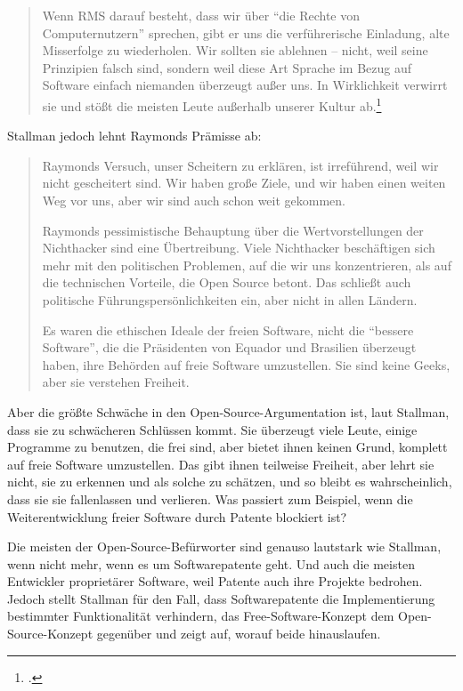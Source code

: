 \begin{quote}
Wenn RMS darauf besteht, dass wir über "`die Rechte von Computernutzern"' sprechen, gibt er uns die verführerische Einladung, alte Misserfolge zu wiederholen. Wir sollten sie ablehnen – nicht, weil seine Prinzipien falsch sind, sondern weil diese Art Sprache im Bezug auf Software einfach niemanden überzeugt außer uns. In Wirklichkeit verwirrt sie und stößt die meisten Leute außerhalb unserer Kultur ab.\footcite[][]{esrshutup}
\end{quote}

Stallman jedoch lehnt Raymonds Prämisse ab:

\begin{quote}
Raymonds Versuch, unser Scheitern zu erklären, ist irreführend, weil wir nicht gescheitert sind. Wir haben große Ziele, und wir haben einen weiten Weg vor uns, aber wir sind auch schon weit gekommen.

Raymonds pessimistische Behauptung über die Wertvorstellungen der Nichthacker sind eine Übertreibung. Viele Nichthacker beschäftigen sich mehr mit den politischen Problemen, auf die wir uns konzentrieren, als auf die technischen Vorteile, die Open Source betont. Das schließt auch politische Führungspersönlichkeiten ein, aber nicht in allen Ländern.

Es waren die ethischen Ideale der freien Software, nicht die "`bessere Software"', die die Präsidenten von Equador und Brasilien überzeugt haben, ihre Behörden auf freie Software umzustellen. Sie sind keine Geeks, aber sie verstehen Freiheit.
\end{quote}

Aber die größte Schwäche in den Open-Source-Argumentation ist, laut Stallman, dass sie zu schwächeren Schlüssen kommt. Sie überzeugt viele Leute, einige Programme zu benutzen, die frei sind, aber bietet ihnen keinen Grund, komplett auf freie Software umzustellen. Das gibt ihnen teilweise Freiheit, aber lehrt sie nicht, sie zu erkennen und als solche zu schätzen, und so bleibt es wahrscheinlich, dass sie sie fallenlassen und verlieren. Was passiert zum Beispiel, wenn die Weiterentwicklung freier Software durch Patente blockiert ist?

Die meisten der Open-Source-Befürworter sind genauso lautstark wie Stallman, wenn nicht mehr, wenn es um Softwarepatente geht. Und auch die meisten Entwickler proprietärer Software, weil Patente auch ihre Projekte bedrohen. Jedoch stellt Stallman für den Fall, dass Softwarepatente die Implementierung bestimmter Funktionalität verhindern, das Free-Software-Konzept dem Open-Source-Konzept gegenüber und zeigt auf, worauf beide hinauslaufen.


